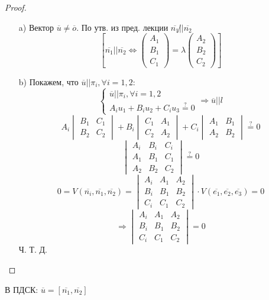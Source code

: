 \begin{proof}
  \begin{itemize}
    \item [a) ]
  Вектор $\overline{u} \neq \overline{o}$. По утв. из пред. лекции $\overline{n_1} \not|| \overline{n_2}$
  \[
  \left[\overline{n_1} || \overline{n_2} \iff \begin{pmatrix}A_1 \\ B_1 \\ C_1 \end{pmatrix} = \lambda \begin{pmatrix}A_2 \\ B_2 \\ C_2 \end{pmatrix}\right]
\]
\item [b) ] Покажем, что $\overline{u} || \pi_i, \forall i = 1, 2$:
  \[
    \begin{cases}
    \overline{u} || \pi_i, \forall i = 1, 2 \\
    A_{i} u_1 + B_{i} u_2 + C_i u_3 \overset{?}{=} 0
    \end{cases} \Rightarrow \overline{u} || l
  \]
  \[
    A_i \begin{vmatrix} B_1 & C_1 \\ B_2 & C_2 \end{vmatrix} + B_i \begin{vmatrix}C_1 & A_1 \\ C_2 & A_2 \end{vmatrix} + C_i \begin{vmatrix}A_1 & B_1 \\ A_2 & B_2 \end{vmatrix} \overset{?}{=} 0
  \]
  \[
    \begin{vmatrix}A_i & B_i & C_i \\ A_1 & B_1 & C_1 \\ A_2 & B_2 & C_2 \end{vmatrix} \overset{?}{=} 0
  \]
  \[
    0 = V(\overline{n_i}, \overline{n_1}, \overline{n_2}) = \begin{vmatrix}A_i & A_1 & A_2 \\ B_i & B_1 & B_2 \\ C_i & C_1 & C_2 \end{vmatrix} \cdot V(\overline{e_1}, \overline{e_2}, \overline{e_3}) = 0
  \]
  \[
  \Rightarrow \begin{vmatrix}A_i & A_1 & A_2 \\ B_i & B_1 & B_2 \\ C_i & C_1 & C_2 \end{vmatrix} = 0
  \]
  Ч. Т. Д.
  \end{itemize}
\end{proof}
\begin{note}
В ПДСК: $\overline{u} = [\overline{n_1}, \overline{n_2}]$
\end{note}
